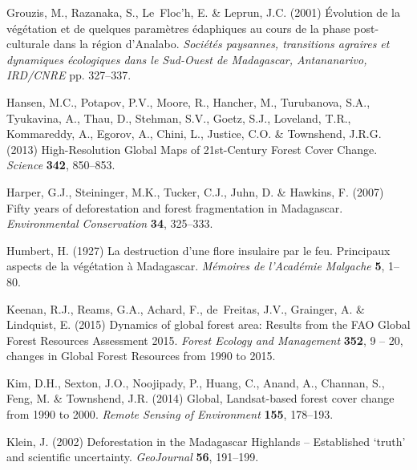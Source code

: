 \documentclass[a4paper, 12pt, leqno]{article}\usepackage[]{graphicx}\usepackage[]{color}
\begin{document}
\begin{thebibliography}{60}
Grouzis, M., Razanaka, S., Le~Floc’h, E. \& Leprun, J.C. (2001)
  {{\'E}volution de la v{\'e}g{\'e}tation et de quelques param{\`e}tres
  {\'e}daphiques au cours de la phase post-culturale dans la r{\'e}gion
  d’Analabo}. \emph{Soci{\'e}t{\'e}s paysannes, transitions agraires et
  dynamiques {\'e}cologiques dans le Sud-Ouest de Madagascar, Antananarivo,
  IRD/CNRE} pp. 327--337.

Hansen, M.C., Potapov, P.V., Moore, R., Hancher, M., Turubanova, S.A.,
  Tyukavina, A., Thau, D., Stehman, S.V., Goetz, S.J., Loveland, T.R.,
  Kommareddy, A., Egorov, A., Chini, L., Justice, C.O. \& Townshend, J.R.G.
  (2013) {High-Resolution Global Maps of 21st-Century Forest Cover Change}.
  \emph{Science} \textbf{342}, 850--853.

Harper, G.J., Steininger, M.K., Tucker, C.J., Juhn, D. \& Hawkins, F. (2007)
  {Fifty years of deforestation and forest fragmentation in Madagascar}.
  \emph{Environmental Conservation} \textbf{34}, 325--333.

Humbert, H. (1927) {La destruction d'une flore insulaire par le feu. Principaux
  aspects de la végétation à Madagascar}. \emph{Mémoires de l'Académie
  Malgache} \textbf{5}, 1--80.

Keenan, R.J., Reams, G.A., Achard, F., de~Freitas, J.V., Grainger, A. \&
  Lindquist, E. (2015) {Dynamics of global forest area: Results from the FAO
  Global Forest Resources Assessment 2015}. \emph{Forest Ecology and
  Management} \textbf{352}, 9 -- 20, changes in Global Forest Resources from
  1990 to 2015.

Kim, D.H., Sexton, J.O., Noojipady, P., Huang, C., Anand, A., Channan, S.,
  Feng, M. \& Townshend, J.R. (2014) {Global, Landsat-based forest cover change
  from 1990 to 2000}. \emph{Remote Sensing of Environment} \textbf{155},
  178--193.

Klein, J. (2002) {Deforestation in the Madagascar Highlands -- Established
  `truth' and scientific uncertainty}. \emph{GeoJournal} \textbf{56}, 191--199.


\end{thebibliography}
\end{document}
